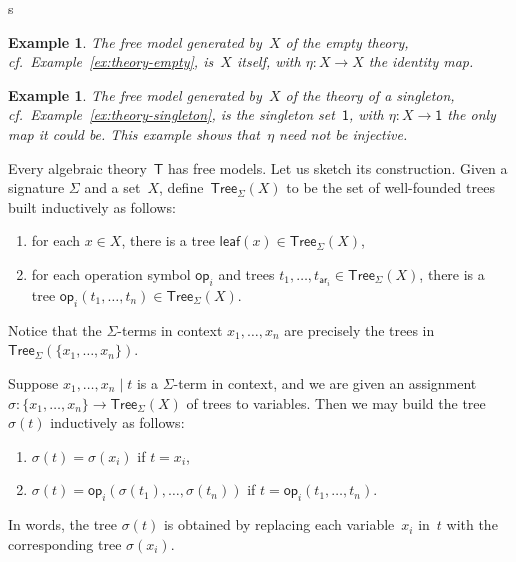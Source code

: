 s\documentclass{amsart}
\newcommand{\theory}[1]{\mathsf{#1}} %
\newcommand{\set}[1]{\{#1\}} %
\newcommand{\Tree}[2]{\mathsf{Tree}_{#1}(#2)} %
\newcommand{\leaf}[1]{\mathsf{leaf}(#1)} %
\newcommand{\op}[1]{\mathsf{op}_{#1}} %
\newcommand{\arity}[1]{\mathsf{ar}_{#1}} %
\newcommand{\one}{\mathsf{1}} %
\newtheorem{example}[definition]{Example}
\begin{document}
\begin{example}
  The free model generated by~$X$ of the empty theory, cf.\ Example~\ref{ex:theory-empty},
  is~$X$ itself, with $\eta : X \to X$ the identity map.
\end{example}

\begin{example}
  The free model generated by~$X$ of the theory of a singleton, cf.\
  Example~\ref{ex:theory-singleton}, is the singleton set~$\one$, with $\eta : X \to \one$
  the only map it could be. This example shows that~$\eta$ need not be injective.
\end{example}

Every algebraic theory~$\theory{T}$ has free models. Let us sketch its
construction. Given a signature $\Sigma$ and a set~$X$,
define~$\Tree{\Sigma}{X}$ to be the set of well-founded trees built inductively
as follows:
%
\begin{enumerate}
\item for each $x \in X$, there is a tree $\leaf{x} \in \Tree{\Sigma}{X}$,
\item for each operation symbol $\op{i}$ and trees
  $t_1, \ldots, t_{\arity{i}} \in \Tree{\Sigma}{X}$, there is a tree
  $\op{i}(t_1, \ldots, t_n) \in \Tree{\Sigma}{X}$.
\end{enumerate}
%
Notice that the $\Sigma$-terms in context $x_1, \ldots, x_n$ are precisely the trees
in $\Tree{\Sigma}{\set{x_1, \ldots, x_n}}$.

Suppose $x_1, \ldots, x_n \mid t$ is a $\Sigma$-term in context, and we are
given an assignment $\sigma : \set{x_1, \ldots, x_n} \to \Tree{\Sigma}{X}$ of
trees to variables. Then we may build the tree $\sigma(t)$ inductively as
follows:
%
\begin{enumerate}
\item $\sigma(t) = \sigma(x_i)$ if $t = x_i$,
\item $\sigma(t) = \op{i}(\sigma(t_1), \ldots, \sigma(t_n))$ if
  $t = \op{i}(t_1, \ldots, t_n)$.
\end{enumerate}
%
In words, the tree $\sigma(t)$ is obtained by replacing each variable~$x_i$ in~$t$ with
the corresponding tree $\sigma(x_i)$.
\end{document}
